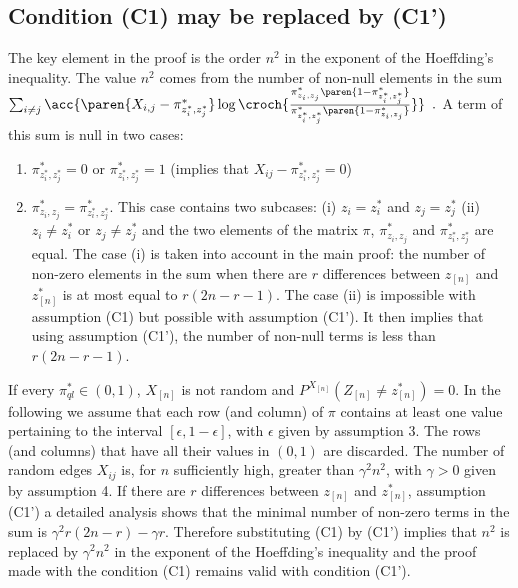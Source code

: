\documentclass[11pt]{article}
\newcommand{\Xn}{X_{[n]}}
\newcommand{\Zn}{Z_{[n]}}
\newcommand{\zn}{z_{[n]}}
\newcommand{\PXn}{P^{\Xn}}
\begin{document}
\subsection{Condition (C1) may be replaced by (C1')}
The key element in the proof is the order $n^2$ in the exponent of the Hoeffding's inequality. The value $n^2$ comes from the number of non-null elements in the sum $\sum_{i\neq j} \acc{\paren{X_{i,j}-\pi^*_{z^*_i,z^*_j}}\log\croch{\frac{\pi^*_{z_i,z_j}\paren{1-\pi^*_{z^*_i,z^*_j}}}{\pi^*_{z^*_i,z^*_j}\paren{1-\pi^*_{z_i,z_j}}}}}\enspace.$ 
A term of this sum is null in two cases:
\begin{enumerate}
  \item $\pi^*_{z^*_i,z^*_j}=0$ or $\pi^*_{z^*_i,z^*_j}=1$ (implies that $X_{ij}-\pi^*_{z^*_i,z^*_j}=0$)
  \item $\pi^*_{z_i,z_j}=\pi^*_{z^*_i,z^*_j}$. This case contains two subcases: (i) $z_i=z^*_i$ and $z_j=z^*_j$  (ii) $z_i \neq z^*_i$ or $z_j \neq z^*_j$ and the two elements of the matrix $\pi$, $\pi^*_{z_i,z_j}$ and $\pi^*_{z^*_i,z^*_j}$ are equal. The case (i) is taken into account in the main proof: the number of non-zero elements in the sum when there are $r$ differences between $\zn$ and $\zn^*$ is at most equal to $r(2n-r-1)$. The case (ii) is impossible with assumption (C1) but possible with assumption (C1'). It then implies that using assumption (C1'), the number of non-null terms is less than $r(2n-r-1)$.
\end{enumerate}
If every $\pi^*_{ql} \in (0,1)$, $\Xn$ is not random and $\PXn(\Zn \neq \zn^*)=0$. In the following we assume that each row (and column) of $\pi$ contains at least one value pertaining to the interval $[\epsilon, 1-\epsilon]$, with $\epsilon$ given by assumption 3. The rows (and columns) that have all their values in $(0,1)$ are discarded.
The number of random edges $X_{ij}$ is, for $n$ sufficiently high, greater than $\gamma^2 n^2$, with $\gamma > 0$ given by assumption 4.
If there are $r$ differences between $\zn$ and $\zn^*$, assumption (C1') a detailed analysis shows that the minimal number of non-zero terms in the sum is $\gamma^2 r(2n-r) -\gamma r$. Therefore substituting (C1) by (C1') implies that  $n^2$ is replaced by $\gamma^2 n^2$ in the exponent of the Hoeffding's inequality and the proof made with the condition (C1) remains valid with condition (C1').




















\end{document}
